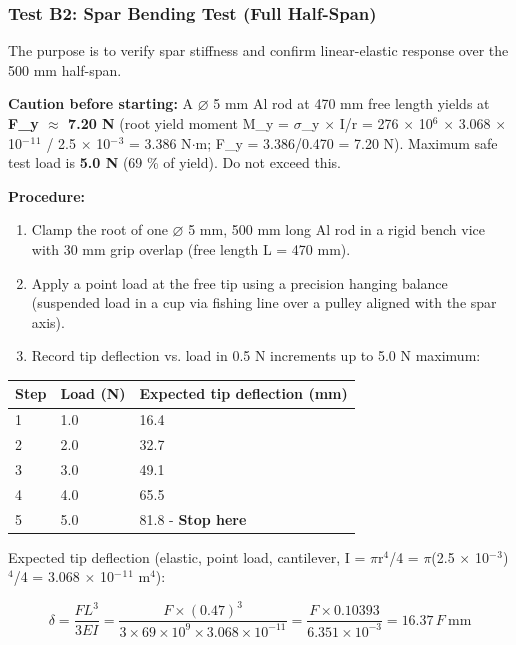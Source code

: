 \documentclass[10pt,a4paper]{article}
\begin{document}
\subsubsection{Test B2: Spar Bending Test (Full Half-Span)}

The purpose is to verify spar stiffness and confirm linear-elastic response over the 500 mm half-span.

\textbf{Caution before starting:} A $\varnothing$ 5 mm Al rod at 470 mm free length yields at \textbf{F\_y ${\approx}$ 7.20 N} (root yield moment M\_y = ${\sigma}$\_y ${\times}$ I/r = 276 ${\times}$ 10$^{6}$ ${\times}$ 3.068 ${\times}$ 10$^{-}$$^{1}$$^{1}$ / 2.5 ${\times}$ 10$^{-}$$^{3}$ = 3.386 N${\cdot}$m; F\_y = 3.386/0.470 = 7.20 N). Maximum safe test load is \textbf{5.0 N} (69 \% of yield). Do not exceed this.

\textbf{Procedure:}
\begin{enumerate}[noitemsep,topsep=2pt]
\item Clamp the root of one $\varnothing$ 5 mm, 500 mm long Al rod in a rigid bench vice with 30 mm grip overlap (free length L = 470 mm).
\item Apply a point load at the free tip using a precision hanging balance (suspended load in a cup via fishing line over a pulley aligned with the spar axis).
\item Record tip deflection vs. load in 0.5 N increments up to 5.0 N maximum:
\end{enumerate}

\begin{center}
\begin{tabular}{|l|l|l|}
\hline
Step & Load (N) & Expected tip deflection (mm) \\
\hline
1 & 1.0 & 16.4 \\
\hline
2 & 2.0 & 32.7 \\
\hline
3 & 3.0 & 49.1 \\
\hline
4 & 4.0 & 65.5 \\
\hline
5 & 5.0 & 81.8 - \textbf{Stop here} \\
\hline
\end{tabular}
\end{center}

Expected tip deflection (elastic, point load, cantilever, I = ${\pi}$r$^{4}$/4 = ${\pi}$(2.5 ${\times}$ 10$^{-}$$^{3}$)$^{4}$/4 = 3.068 ${\times}$ 10$^{-}$$^{1}$$^{1}$ m$^{4}$):

\[
\delta = \frac{FL^3}{3EI} = \frac{F \times (0.47)^3}{3 \times 69 \times 10^9 \times 3.068 \times 10^{-11}} = \frac{F \times 0.10393}{6.351 \times 10^{-3}} = 16.37\,F\ \text{mm}
\]
\end{document}
